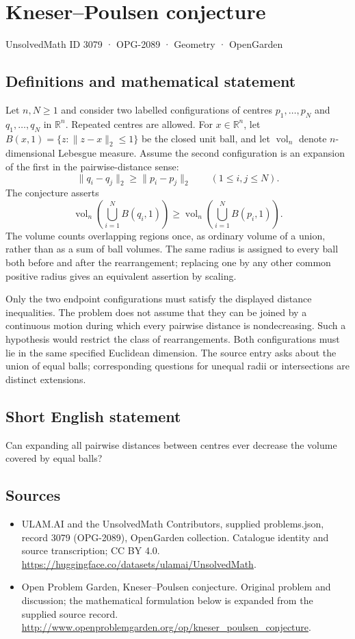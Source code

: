 \documentclass[11pt,a4paper]{article}
\begin{document}
\section*{Kneser–Poulsen conjecture}\label{3079}
{\small UnsolvedMath ID 3079 · OPG-2089 · Geometry · OpenGarden}
\subsection{Definitions and mathematical statement}
Let $n,N\ge1$ and consider two labelled configurations of centres
$p_1,\ldots,p_N$ and $q_1,\ldots,q_N$ in $\mathbb R^n$.
Repeated centres are allowed. For $x\in\mathbb R^n$, let
$B(x,1)=\{z:\|z-x\|_2\le1\}$ be the closed unit ball, and let
$\operatorname{vol}_n$ denote $n$-dimensional Lebesgue measure.
Assume the second configuration is an expansion of the first in the
pairwise-distance sense:
\[
 \|q_i-q_j\|_2\ge\|p_i-p_j\|_2
                    \qquad(1\le i,j\le N).
\]
The conjecture asserts
\[
 \operatorname{vol}_n\!\left(\bigcup_{i=1}^N B(q_i,1)\right)
 \ge
 \operatorname{vol}_n\!\left(\bigcup_{i=1}^N B(p_i,1)\right).
\]
The volume counts overlapping regions once, as ordinary volume of a
union, rather than as a sum of ball volumes. The same radius is assigned
to every ball both before and after the rearrangement; replacing one by
any other common positive radius gives an equivalent assertion by scaling.

Only the two endpoint configurations must satisfy the displayed distance
inequalities. The problem does not assume that they can be joined by a
continuous motion during which every pairwise distance is nondecreasing.
Such a hypothesis would restrict the class of rearrangements. Both
configurations must lie in the same specified Euclidean dimension.
The source entry asks about the union of equal balls; corresponding
questions for unequal radii or intersections are distinct extensions.
\subsection{Short English statement}
Can expanding all pairwise distances between centres ever decrease the volume covered by equal balls?
\subsection{Sources}
\begin{itemize}
\item[S1] ULAM.AI and the UnsolvedMath Contributors, supplied problems.json, record 3079 (OPG-2089), OpenGarden collection. Catalogue identity and source transcription; CC BY 4.0.
\url{https://huggingface.co/datasets/ulamai/UnsolvedMath}.
\item[S2] Open Problem Garden, Kneser–Poulsen conjecture. Original problem and discussion; the mathematical formulation below is expanded from the supplied source record.
\url{http://www.openproblemgarden.org/op/kneser_poulsen_conjecture}.
\end{itemize}
\end{document}
